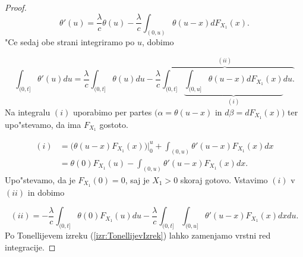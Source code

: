 \documentclass[12pt, a4paper, reqno]{amsart}
\theoremstyle{definition}
\theoremstyle{plain}
\newcommand{\1}{\mathds{1}}
\begin{document}
\begin{proof}
                \begin{equation*}
                    \theta'(u) = \frac{\lambda}{c}\theta(u) - \frac{\lambda}{c}\int_{(0, u)}\theta(u - x)dF_{X_1}(x).
                \end{equation*}
                "Ce sedaj obe strani integriramo po $u$, dobimo
                
                \begin{equation}
                    \int_{(0, t]}\theta'(u)du = \frac{\lambda}{c}\int_{(0, t]}\theta(u)du - \overbrace{\frac{\lambda}{c}\int_{(0, t]}\underbrace{\int_{(0, u]}\theta(u - x)dF_{X_1}(x)}_{(i)}du.}^{(ii)} 
                    \label{eq:verjetnostPrezivetjaIntegral}
                \end{equation}
                Na integralu $(i)$ uporabimo per partes $\bigl(\alpha = \theta(u-x)$ in $d\beta = dF_{X_1}(x)\bigr)$ 
                ter upo"stevamo, da ima $F_{X_1}$ gostoto.

                \begin{align*}
                    (i)     &= \bigl(\theta(u - x)F_{X_1}(x)\bigr)\Big|_{0}^{u} + \int_{(0, u)}\theta'(u - x)F_{X_1}(x)dx \\
                            &= \theta(0)F_{X_1}(u) - \int_{(0, u)}\theta'(u - x)F_{X_1}(x)dx.
                \end{align*}
                Upo"stevamo, da je $F_{X_1}(0) = 0$, saj je $X_1 > 0$ skoraj gotovo. Vstavimo $(i)$ 
                v $(ii)$ in dobimo

                \begin{equation*}
                    (ii) =  - \frac{\lambda}{c}\int_{(0, t]}\theta(0)F_{X_1}(u)du - \frac{\lambda}{c}\int_{(0, t]}\int_{(0, u]}\theta'(u - x)F_{X_1}(x)dxdu. 
                \end{equation*}
                Po Tonellijevem izreku (\ref{izr:TonellijevIzrek}) lahko zamenjamo vrstni red integracije.


\end{proof}
\end{document}

